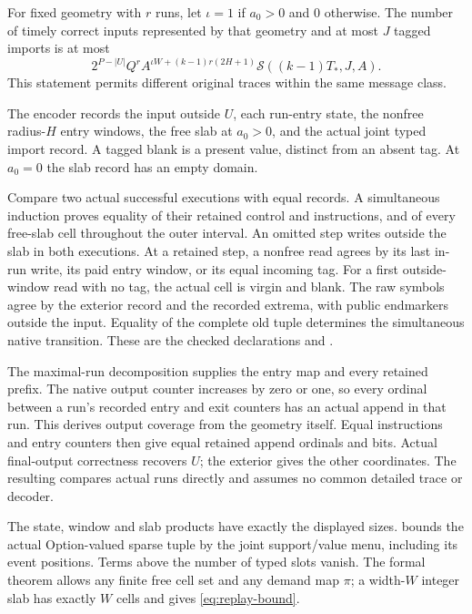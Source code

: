 \begin{theorem}\label{thm:replay}
For fixed geometry with $r$ runs, let $\iota=1$ if $a_0>0$ and $0$ otherwise.
The number of timely correct inputs represented by that geometry and at most
$J$ tagged imports is at most
\begin{equation}\label{eq:replay-bound}
 2^{P-|U|}Q^r A^{\iota W+(k-1)r(2H+1)}\mathcal S((k-1)T_*,J,A).
\end{equation}
This statement permits different original traces within the same message class.
\end{theorem}
\begin{outline}
The encoder records the input outside $U$, each run-entry state, the nonfree
radius-$H$ entry windows, the free slab at $a_0>0$, and the actual joint
typed import record. A tagged blank is a present value, distinct from an
absent tag. At $a_0=0$ the slab record has an empty domain.

Compare two actual successful executions with equal records. A simultaneous
induction proves equality of their retained control and instructions, and
of every free-slab cell throughout the outer interval. An omitted step
writes outside the slab in both executions. At a retained step, a nonfree
read agrees by its last in-run write, its paid entry window, or its equal
incoming tag. For a first outside-window read with no tag, the actual cell
is virgin and blank. The raw symbols agree by the exterior record and the
recorded extrema, with public endmarkers outside the input. Equality of the
complete old tuple determines the simultaneous native transition. These
are the checked declarations
 and
.

The maximal-run decomposition supplies the entry map and every retained
prefix. The native output counter increases by zero or one, so every ordinal
between a run's recorded entry and exit counters has an actual append in
that run. This derives output coverage from the geometry itself. Equal
instructions and entry counters then give equal retained append ordinals and
bits. Actual final-output correctness recovers $U$; the exterior gives the
other coordinates. The resulting  compares
actual runs directly and assumes no common detailed trace or decoder.

The state, window and slab products have exactly the displayed sizes.
 bounds the actual Option-valued sparse tuple
by the joint support/value menu, including its event positions. Terms above
the number of typed slots vanish. The formal theorem allows any finite free
cell set and any demand map $\pi$; a width-$W$ integer slab has exactly $W$
cells and gives \cref{eq:replay-bound}.
\end{outline}

